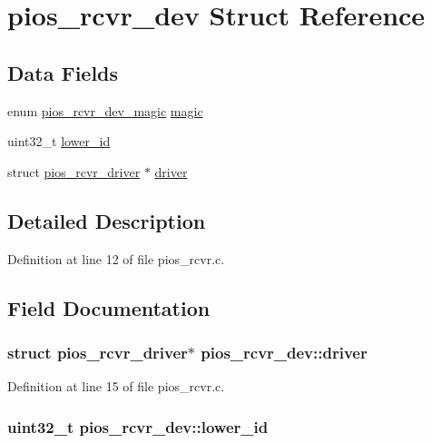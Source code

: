 \hypertarget{structpios__rcvr__dev}{\section{pios\-\_\-rcvr\-\_\-dev \-Struct \-Reference}
\label{structpios__rcvr__dev}
}
\subsection*{\-Data \-Fields}
\begin{DoxyCompactItemize}
\item 
enum \hyperlink{pios__rcvr_8c_a11e2b6a532db57920c845a7ea633d783}{pios\-\_\-rcvr\-\_\-dev\-\_\-magic} \hyperlink{structpios__rcvr__dev_aa167293d3d19f1030cc61a2fc386eb66}{magic}
\item 
uint32\-\_\-t \hyperlink{structpios__rcvr__dev_ae6499b31e342e883508673e1503ef9f8}{lower\-\_\-id}
\item 
struct \hyperlink{structpios__rcvr__driver}{pios\-\_\-rcvr\-\_\-driver} $\ast$ \hyperlink{structpios__rcvr__dev_ae98111737eb04ac4a0af52ff20e934b3}{driver}
\end{DoxyCompactItemize}


\subsection{\-Detailed \-Description}


\-Definition at line 12 of file pios\-\_\-rcvr.\-c.



\subsection{\-Field \-Documentation}
\hypertarget{structpios__rcvr__dev_ae98111737eb04ac4a0af52ff20e934b3}{
\subsubsection[{driver}]{\setlength{\rightskip}{0pt plus 5cm}struct {\bf pios\-\_\-rcvr\-\_\-driver}$\ast$ {\bf pios\-\_\-rcvr\-\_\-dev\-::driver}}}\label{structpios__rcvr__dev_ae98111737eb04ac4a0af52ff20e934b3}


\-Definition at line 15 of file pios\-\_\-rcvr.\-c.

\hypertarget{structpios__rcvr__dev_ae6499b31e342e883508673e1503ef9f8}{
\subsubsection[{lower\-\_\-id}]{\setlength{\rightskip}{0pt plus 5cm}uint32\-\_\-t {\bf pios\-\_\-rcvr\-\_\-dev\-::lower\-\_\-id}}}\label{structpios__rcvr__dev_ae6499b31e342e883508673e1503ef9f8}


